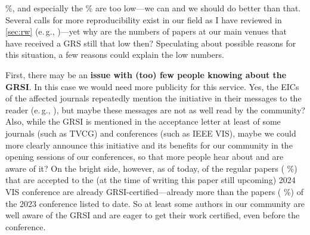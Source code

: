 \documentclass[conference,svgnames]{vgtc}                     %
\newcommand*{\percentageRounded}[2]{%
	\pgfmathparse{#1*100/#2}%
	\pgfmathprintnumber[fixed, precision=1]{\pgfmathresult}%
}
\newcommand{\eg}{e.\,g.}
\begin{document}
\percentageRounded{(\GrsiIeeeVisTVCGJournalPapersInMMXXIV+\GrsiIeeeVisTVCGJournalPapersInMMXXIII+\GrsiIeeeVisTVCGJournalPapersInMMXXII+\GrsiIeeeVisTVCGJournalPapersInMMXXI)}{(\TotalIeeeVisTVCGJournalPapersInMMXXIV+\TotalIeeeVisTVCGJournalPapersInMMXXIII+\TotalIeeeVisTVCGJournalPapersInMMXXII+\TotalIeeeVisTVCGJournalPapersInMMXXI)}\%, and especially the \percentageRounded{(\GrsiIeeeVisPapersInMMXXIV+\GrsiIeeeVisPapersInMMXXIII+\GrsiIeeeVisPapersInMMXXII+\GrsiIeeeVisPapersInMMXXI)}{(124+133+119+109)}\% are too low---we can and we should do better than that. Several calls for more reproducibility exist in our field as I have reviewed in \autoref{sec:rw} (\eg, \cite{Fekete:2020:ERV,Haroz:2018:OPV,Kosara:2016:EBS})---yet why are the numbers of papers at our main venues that have received a GRS still that low then? Speculating about possible reasons for this situation, a few reasons could explain the low numbers.

First, there may be an \textbf{issue with (too) few people knowing about the GRSI}. In this case we would need more publicity for this service. Yes, the EICs of the affected journals repeatedly mention the initiative in their messages to the reader (\eg, \cite{DeFloriani:2018:MEC,Jorge:2018:EN}), but maybe these messages are not as well read by the community? Also, while the GRSI is mentioned in the acceptance letter at least of some journals (such as TVCG) and conferences (such as IEEE VIS), maybe we could more clearly announce this initiative and its benefits for our community in the opening sessions of our conferences, so that more people hear about and are aware of it? On the bright side, however, as of today, \GrsiIeeeVisPapersInMMXXIV{} of the \TotalIeeeVisPapersInMMXXIV{} regular papers (\percentageRounded{\GrsiIeeeVisPapersInMMXXIV}{\TotalIeeeVisPapersInMMXXIV}\%) that are accepted to the (at the time of writing this paper still upcoming) 2024 VIS conference are already GRSI-certified---already more than the \GrsiIeeeVisPapersInMMXXIII{} papers (\percentageRounded{\GrsiIeeeVisPapersInMMXXIII}{\TotalIeeeVisPapersInMMXXIII}\%) of the 2023 conference 
listed to date. So at least some authors in our community are well aware of the GRSI and are eager to get their work certified, even before the conference.
\end{document}
